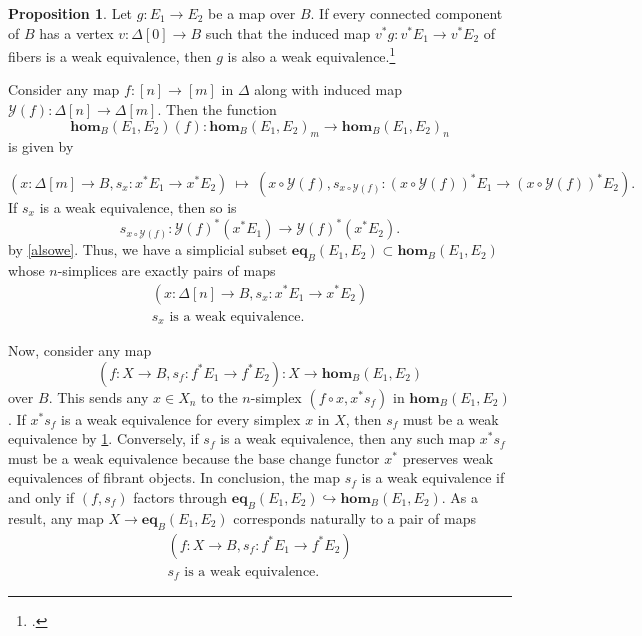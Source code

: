 \documentclass[10pt,letterpaper,cm]{nupset}
\theoremstyle{definition}
\theoremstyle{theorem}
\newtheorem{prop}[definition]{Proposition}
\theoremstyle{remark}
\newcommand{\0}{\mathbf{0}}
\newcommand{\1}{\mathbf{1}}
\newcommand{\2}{\mathbf{2}}
\begin{document}
\begin{prop}\label{thenweq}
Let  $g : E_1 \to E_2$ be a map over $B$. If every connected component of $B$ has a vertex $v: \Delta[0] \to B$ such that the induced map $v^{\ast}{g}: v^{\ast}{E_1} \to v^{\ast}{E_2}$ of fibers is a weak equivalence, then $g$ is also a weak equivalence.\footnote{\autocite[Lemma 3.2.7]{KL}.}
\end{prop}

\smallskip

Consider any map $f: \left[n\right] \to \left[m\right]$ in $\varDelta$ along with induced map $\mathcal{Y}(f) : \Delta[n] \to \Delta[m]$. Then the function $$\mathbf{hom}_B(E_1, E_2)(f) : \mathbf{hom}_B(E_1, E_2)_m \to \mathbf{hom}_B(E_1, E_2)_n$$ is given by 

\[
\left(x: \Delta[m] \to B, s_x: x^{\ast}{E_{1}} \to x^{\ast}{E_{2}}\right) \ \mapsto \ \left(x \circ \mathcal{Y}(f), s_{x \circ \mathcal{Y}(f)} : \left(x \circ \mathcal{Y}(f)\right)^{\ast}{E_{1}} \to \left(x \circ \mathcal{Y}(f)\right)^{\ast}{E_{2}}\right).
\]
If $s_x$ is a weak equivalence, then so is
\[
s_{x \circ \mathcal{Y}(f)} : \mathcal{Y}(f)^{\ast}\left(x^{\ast}{E_{1}}\right) \to  \mathcal{Y}(f)^{\ast}\left(x^{\ast}{E_{2}}\right).
\] by \cref{alsowe}. Thus, we have a simplicial subset $\mathbf{eq}_B(E_1, E_2) \subset \mathbf{hom}_B(E_1, E_2)$ whose $n$-simplices are exactly pairs of maps
\begin{gather*}
\left(x: \Delta[n]\to B, s_x : x^{\ast}{E_1} \to x^{\ast}{E_2}\right)
\\ s_x \text{ is a weak equivalence}.
\end{gather*}

\smallskip

Now, consider any map $$\left(f:X \to B, s_f : f^{\ast}{E_1} \to f^{\ast}{E_2}\right) : X \to  \mathbf{hom}_B(E_1, E_2)$$ over $B$. This sends any $x\in X_n$ to the $n$-simplex $\left(f\circ x, x^{\ast}{s_f}\right)$ in $\mathbf{hom}_B(E_1, E_2)$. If $x^{\ast}{s_f}$ is a weak equivalence for every simplex $x$ in $X$, then $s_f$ must be a weak equivalence by \cref{thenweq}. Conversely, if $s_f$ is a weak equivalence, then any such  map $x^{\ast}{s_f}$ must be a weak equivalence because the base change functor $x^{\ast}$ preserves weak equivalences of fibrant objects. In conclusion, the map $s_f$ is a weak equivalence if and only if $\left(f,s_f\right)$ factors through $\mathbf{eq}_B(E_1, E_2) \hookrightarrow  \mathbf{hom}_B(E_1, E_2)$. As a result, any map $X \to \mathbf{eq}_B(E_1, E_2)$ corresponds naturally to a pair of maps
\begin{gather*}
\label{equniv} \left(f: X\to B, s_f : f^{\ast}{E_1} \to f^{\ast}{E_2}\right) \tag{$\bigstar$}
\\ s_f \text{ is a weak equivalence}.
\end{gather*}
\end{document}
